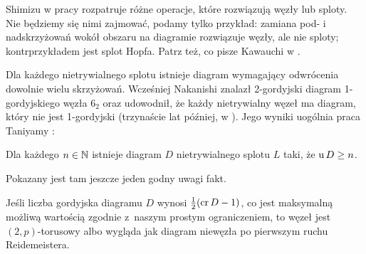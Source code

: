 Shimizu w pracy \cite{shimizu14} rozpatruje różne operacje, które rozwiązują węzły lub sploty.
%
Nie będziemy się nimi zajmować, podamy tylko przykład: zamiana pod- i nadskrzyżowań wokół obszaru na diagramie rozwiązuje węzły, ale nie sploty; kontrprzykładem jest splot Hopfa.
%
Patrz też, co pisze Kawauchi w \cite[s. 141-154]{kawauchi96}.

Dla każdego nietrywialnego splotu istnieje diagram wymagający odwrócenia dowolnie wielu skrzyżowań.
Wcześniej Nakanishi \cite{nakanishi83} znalazł 2-gordyjski diagram 1-gordyjskiego węzła $6_2$ oraz udowodnił, że każdy nietrywialny węzeł ma diagram, który nie jest 1-gordyjski (trzynaście lat później, w \cite{nakanishi96}).
%
Jego wyniki uogólnia praca Taniyamy \cite{taniyama09}:
%

\begin{proposition}
    Dla każdego $n \in \mathbb N$ istnieje diagram $D$ nietrywialnego splotu $L$ taki, że $\operatorname{u} D \ge n$.
\end{proposition}

Pokazany jest tam jeszcze jeden godny uwagi fakt.

\begin{proposition}
    Jeśli liczba gordyjska diagramu $D$ wynosi $\frac 12 (\operatorname{cr} D - 1)$, co jest maksymalną możliwą wartością zgodnie z~naszym prostym ograniczeniem, to węzeł jest $(2,p)$-torusowy albo wygląda jak diagram niewęzła po pierwszym ruchu Reidemeistera.
\end{proposition}











%


